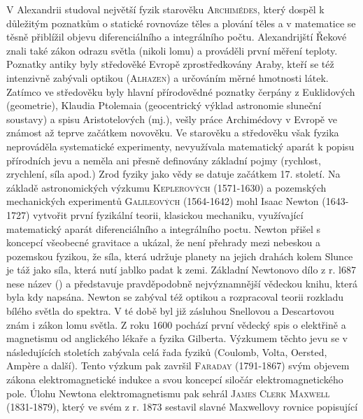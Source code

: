    V Alexandrii studoval největší fyzik starověku \textsc{Archimédes}, který dospěl k důležitým
    poznatkům o statické rovnováze těles a plování těles a v matematice se těsně přiblížil objevu
    diferenciálního a integrálního počtu. Alexandrijští Řekové znali také zákon odrazu světla
    (nikoli lomu) a prováděli první měření teploty. Poznatky antiky byly středověké Evropě
    zprostředkovány Araby, kteří se též intenzivně zabývali optikou (\textsc{Alhazen}) a určováním
    měrné hmotnosti látek. Zatímco ve středověku byly hlavní přírodovědné poznatky čerpány z
    Euklidových  (geometrie),  Klaudia Ptolemaia (geocentrický výklad
    astronomie sluneční soustavy) a spisu Aristotelových (mj.), vešly práce Archimédovy v
    Evropě ve známost až teprve začátkem novověku. Ve starověku a středověku však fyzika neprováděla
    systematické experimenty, nevyužívala matematický aparát k popisu přírodních jevu a neměla ani
    přesně definovány základní pojmy (rychlost, zrychlení, síla apod.) Zrod fyziky jako vědy se
    datuje začátkem 17. století. Na základě astronomických výzkumu \textsc{Keplerových} (1571-1630)
    a pozemských mechanických experimentů\textsc{ Galileových} (1564-1642) mohl Isaac Newton
    (1643-1727) vytvořit první fyzikální teorii, klasickou mechaniku, využívající matematický aparát
    diferenciálního a integrálního poctu. Newton přišel s koncepcí všeobecné gravitace a ukázal, že
    není přehrady mezi nebeskou a pozemskou fyzikou, že síla, která udržuje planety na jejich
    drahách kolem Slunce je táž jako síla, která nutí jablko padat k zemi. Základní Newtonovo dílo z
    r. l687 nese název  () a představuje pravděpodobně nejvýznamnější vědeckou knihu, která byla
    kdy napsána. Newton se zabýval též optikou a rozpracoval teorii rozkladu bílého světla do
    spektra. V té době byl již zásluhou Snellovou a Descartovou znám i zákon lomu světla. Z roku
    1600 pochází první vědecký spis o elektřině a magnetismu od anglického lékaře a fyzika Gilberta.
    Výzkumem  těchto jevu se v následujících stoletích zabývala celá řada fyziků (Coulomb, Volta,
    Oersted, Amp\`{e}re a další). Tento výzkum pak završil \textsc{Faraday} (1791-1867) svým objevem
    zákona elektromagnetické indukce a svou koncepcí siločár elektromagnetického pole. Úlohu Newtona
    elektromagnetismu pak sehrál \textsc{James Clerk Maxwell} (1831-1879), který ve svém
     z r. 1873 sestavil slavné Maxwellovy rovnice popisující
